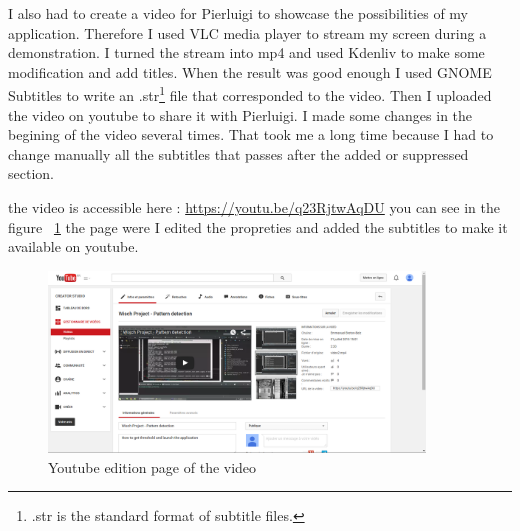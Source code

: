 	\par I also had to create a video for Pierluigi to showcase the possibilities of my application. Therefore I used VLC media player to stream my screen during a demonstration. I turned the stream into mp4 and used Kdenliv to make some modification and add titles. When the result was good enough I used GNOME Subtitles to write an .str\footnote{.str is the standard format of subtitle files.} file that corresponded to the video. Then I uploaded the video on youtube to share it with Pierluigi. I made some changes in the begining of the video several times. That took me a long time because I had to change manually all the subtitles that passes after the added or suppressed section.
	\par the video is accessible here : \url{https://youtu.be/q23RjtwAqDU} you can see in the figure ~\ref{video} the page were I edited the propreties and added the subtitles to make it available on youtube.
\begin{figure}[h]
		\begin{center}
			\includegraphics[width=10cm]{images_not_compressed/screenShot.png}
			\caption{Youtube edition page of the video}
			\label{video}	
		\end{center}
	\end{figure}	